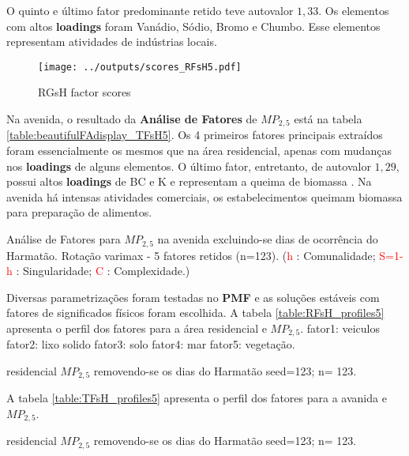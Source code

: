 O quinto e último fator predominante retido teve autovalor $1,33$. 
Os elementos com altos \textbf{loadings} foram Vanádio, Sódio, Bromo e Chumbo.
Esse elementos representam atividades de indústrias locais. 

\begin{figure}[H]
  \centering
  \texttt{[image: ../outputs/scores\_RFsH5.pdf]}
  \caption{RGsH factor scores}
\end{figure}

Na avenida, o resultado da \textbf{Análise de Fatores} de $MP_{2,5}$ está na 
tabela \ref{table:beautifulFAdisplay_TFsH5}. Os 4 primeiros fatores principais extraídos 
foram essencialmente os mesmos que na área residencial, apenas com mudanças nos 
\textbf{loadings} de alguns elementos. O último fator, entretanto, de autovalor
$1,29$, possui altos \textbf{loadings} de BC e K e representam a queima de 
biomassa \citep{reid2005}. Na avenida há intensas atividades comerciais, 
os estabelecimentos queimam biomassa para preparação de alimentos.   

\begin{table}[H]
  
  \caption{Análise de Fatores para $MP_{2,5}$ na avenida
           excluindo-se dias de ocorrência do Harmatão.
           Rotação varimax - 5 fatores retidos (n=123).
           (\textcolor{red}{h} : Comunalidade; 
           \textcolor{red}{S=1-h} : Singularidade; 
           \textcolor{red}{C} : Complexidade.)
           \label{table:beautifulFAdisplay_TFsH5}}
\end{table}


Diversas parametrizações foram testadas no \textbf{PMF} e as soluções estáveis 
com fatores de significados físicos foram escolhida. 
A tabela \ref{table:RFsH_profiles5} apresenta o perfil dos fatores para a área
residencial e $MP_{2,5}$. 
fator1: veiculos
fator2: lixo solido
fator3: solo
fator4: mar
fator5: vegetação.

\begin{table}[H]
  \centering
    
    \caption{residencial $MP_{2,5}$ removendo-se os dias do Harmatão 
              seed=123; n= 123. 
             \label{table:RFsH_profiles5}}
\end{table}

A tabela \ref{table:TFsH_profiles5} apresenta o perfil dos fatores para a avanida
e $MP_{2,5}$.

\begin{table}[H]
  \centering
    
    \caption{residencial $MP_{2,5}$ removendo-se os dias do Harmatão 
              seed=123; n= 123. 
             \label{table:TFsH_profiles5}}
\end{table}

